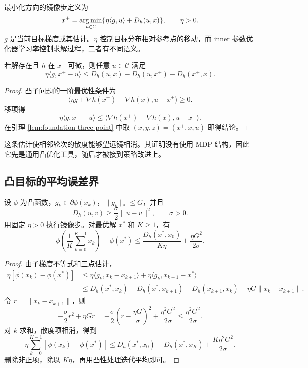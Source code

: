 最小化方向的镜像步定义为
\begin{equation}
 x^+=\operatorname*{arg\,min}_{u\in\mathcal C}
 \{\eta\langle g,u\rangle+D_h(u,x)\},\qquad\eta>0.
 \label{eq:foundation-md-min}
\end{equation}
$g$ 是当前目标梯度或其估计。$\eta$ 控制目标分布相对参考点的移动，而 inner 参数优化器学习率控制求解过程，二者有不同语义。

\begin{proposition}[镜像步的三点不等式]
\label{prop:foundation-md-three-point}
若解存在且 $h$ 在 $x^+$ 可微，则任意 $u\in\mathcal C$ 满足
\begin{equation}
 \eta\langle g,x^+-u\rangle
 \leq D_h(u,x)-D_h(u,x^+)-D_h(x^+,x).
 \label{eq:foundation-md-three-point}
\end{equation}
\end{proposition}
\begin{proof}
凸子问题的一阶最优性条件为
\[
 \langle\eta g+\nabla h(x^+)-\nabla h(x),u-x^+\rangle\geq0.
\]
移项得
\[
 \eta\langle g,x^+-u\rangle
 \leq\langle\nabla h(x^+)-\nabla h(x),u-x^+\rangle.
\]
在引理 \ref{lem:foundation-three-point} 中取 $(x,y,z)=(x^+,x,u)$ 即得结论。
\end{proof}

这条估计使相邻轮次的散度能够望远镜相消。其证明没有使用 MDP 结构，因此它先是通用凸优化工具，随后才被接到策略改进上。

\subsection{凸目标的平均误差界}

\begin{theorem}[凸镜像下降的误差界]
\label{thm:foundation-convex-md}
设 $\phi$ 为凸函数，$g_k\in\partial\phi(x_k)$，$\lVert g_k\rVert_*\leq G$，并且
\[
 D_h(u,v)\geq\frac\sigma2\lVert u-v\rVert^2,\qquad\sigma>0.
\]
用固定 $\eta>0$ 执行镜像步。对最优解 $x^*$ 和 $K\geq1$，有
\begin{equation}
 \phi\left(\frac1K\sum_{k=0}^{K-1}x_k\right)-\phi(x^*)
 \leq\frac{D_h(x^*,x_0)}{K\eta}+\frac{\eta G^2}{2\sigma}.
 \label{eq:foundation-convex-md-rate}
\end{equation}
\end{theorem}
\begin{proof}
由子梯度不等式和三点估计，
\begin{align*}
 \eta[\phi(x_k)-\phi(x^*)]
 &\leq\eta\langle g_k,x_k-x_{k+1}\rangle
      +\eta\langle g_k,x_{k+1}-x^*\rangle\\
 &\leq D_h(x^*,x_k)-D_h(x^*,x_{k+1})
      -D_h(x_{k+1},x_k)+\eta G\lVert x_k-x_{k+1}\rVert.
\end{align*}
令 $r=\lVert x_k-x_{k+1}\rVert$，则
\[
 -\frac\sigma2r^2+\eta Gr
 =-\frac\sigma2\left(r-\frac{\eta G}\sigma\right)^2
   +\frac{\eta^2G^2}{2\sigma}
 \leq\frac{\eta^2G^2}{2\sigma}.
\]
对 $k$ 求和，散度项相消，得到
\[
 \eta\sum_{k=0}^{K-1}[\phi(x_k)-\phi(x^*)]
 \leq D_h(x^*,x_0)-D_h(x^*,x_K)+\frac{K\eta^2G^2}{2\sigma}.
\]
删除非正项，除以 $K\eta$，再用凸性处理迭代平均即可。
\end{proof}

